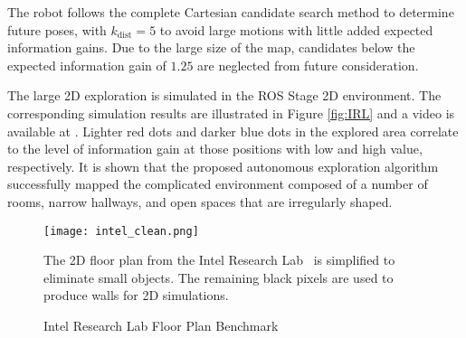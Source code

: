 The robot follows the complete Cartesian candidate search method to determine future poses, with $k_\text{dist}=5$ to avoid large motions with little added expected information gains. Due to the large size of the map, candidates below the expected information gain of $1.25$ are neglected from future consideration.

The large 2D exploration is simulated in the ROS Stage 2D environment. The corresponding simulation results are illustrated in Figure \ref{fig:IRL} and a video is available at \href{https://www.youtube.com/watch?v=5VdzKHreB_s}{}.
Lighter red dots and darker blue dots in the explored area correlate to the level of information gain at those positions with low and high value, respectively. It is shown that the proposed autonomous exploration algorithm successfully mapped the complicated environment composed of a number of rooms, narrow hallways, and open spaces that are irregularly shaped.


\begin{figure}
	\centering
	\texttt{[image: intel\_clean.png]}
	\caption{Intel Research Lab Floor Plan Benchmark}
	\medskip
	\small
	The 2D floor plan from the Intel Research Lab~\cite{kummerle2009measuring} is simplified to eliminate small objects. The remaining black pixels are used to produce walls for 2D simulations.
\label{fig:intel}
\end{figure}


